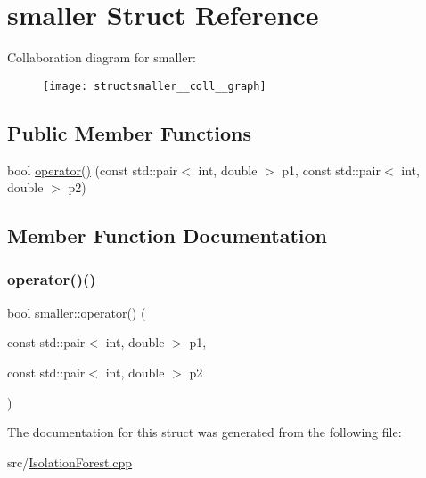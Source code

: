 \hypertarget{structsmaller}{}\section{smaller Struct Reference}
\label{structsmaller}


Collaboration diagram for smaller\+:\nopagebreak
\begin{figure}[H]
\begin{center}
\leavevmode
\texttt{[image: structsmaller\_\_coll\_\_graph]}
\end{center}
\end{figure}
\subsection*{Public Member Functions}
\begin{DoxyCompactItemize}
\item 
bool \hyperlink{structsmaller_ad76a76ed9b4fa9d8b9ff1a35988d9a48}{operator()} (const std\+::pair$<$ int, double $>$ p1, const std\+::pair$<$ int, double $>$ p2)
\end{DoxyCompactItemize}


\subsection{Member Function Documentation}
\mbox{\label{structsmaller_ad76a76ed9b4fa9d8b9ff1a35988d9a48}} 
\subsubsection{\texorpdfstring{operator()()}{operator()()}}
{\footnotesize\ttfamily bool smaller\+::operator() (\begin{DoxyParamCaption}\item[{const std\+::pair$<$ int, double $>$}]{p1,  }\item[{const std\+::pair$<$ int, double $>$}]{p2 }\end{DoxyParamCaption})\hspace{0.3cm}{\ttfamily [inline]}}



The documentation for this struct was generated from the following file\+:\begin{DoxyCompactItemize}
\item 
src/\hyperlink{IsolationForest_8cpp}{Isolation\+Forest.\+cpp}\end{DoxyCompactItemize}
